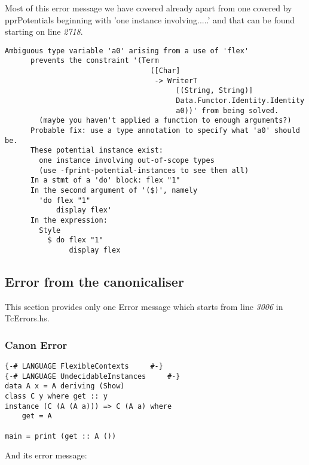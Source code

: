 \documentclass[a4paper]{article}
\begin{document}
Most of this error message we have covered already apart from one covered by pprPotentials beginning with 'one instance involving.....' and that can be found starting on line \textit{2718}. 

\begin{lstlisting}[label={lst: T21.0.2}, numbers=none, caption={Error}]
      Ambiguous type variable 'a0' arising from a use of 'flex'
      prevents the constraint '(Term
                                  ([Char]
                                   -> WriterT
                                        [(String, String)]
                                        Data.Functor.Identity.Identity
                                        a0))' from being solved.
        (maybe you haven't applied a function to enough arguments?)
      Probable fix: use a type annotation to specify what 'a0' should be.
      These potential instance exist:
        one instance involving out-of-scope types
        (use -fprint-potential-instances to see them all)
      In a stmt of a 'do' block: flex "1"
      In the second argument of '($)', namely
        'do flex "1"
            display flex'
      In the expression:
        Style
          $ do flex "1"
               display flex
\end{lstlisting}

\pagebreak
\subsection{Error from the canonicaliser}

This section provides only one Error message which starts from line \textit{3006} in TcErrors.hs. 

\subsubsection{Canon Error}


\begin{lstlisting}[label={lst: T??.0}, numbers=none, caption={Example Program \cite{ex100}}]
{-# LANGUAGE FlexibleContexts     #-}
{-# LANGUAGE UndecidableInstances     #-}
data A x = A deriving (Show)
class C y where get :: y
instance (C (A (A a))) => C (A a) where
    get = A

main = print (get :: A ())
\end{lstlisting}

And its error message:
\end{document}
